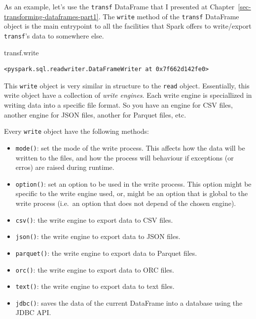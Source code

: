 \documentclass[
  11pt,
  letterpaper,
  DIV=11,
  numbers=noendperiod]{scrreprt}
\newenvironment{Shaded}{\begin{snugshade}}{\end{snugshade}}
\newcommand{\NormalTok}[1]{\textcolor[rgb]{0.00,0.23,0.31}{#1}}
\providecommand{\tightlist}{%
  \setlength{\itemsep}{0pt}\setlength{\parskip}{0pt}}\usepackage{longtable,booktabs,array}
\begin{document}
As an example, let's use the \texttt{transf} DataFrame that I presented
at Chapter~\ref{sec-transforming-dataframes-part1}. The \texttt{write}
method of the \texttt{transf} DataFrame object is the main entrypoint to
all the facilities that Spark offers to write/export \texttt{transf}'s
data to somewhere else.

\begin{Shaded}
\begin{Highlighting}[]
\NormalTok{transf.write}
\end{Highlighting}
\end{Shaded}

\begin{verbatim}
<pyspark.sql.readwriter.DataFrameWriter at 0x7f662d142fe0>
\end{verbatim}

This \texttt{write} object is very similar in structure to the
\texttt{read} object. Essentially, this write object have a collection
of \emph{write engines}. Each write engine is speciallized in writing
data into a specific file format. So you have an engine for CSV files,
another engine for JSON files, another for Parquet files, etc.

Every \texttt{write} object have the following methods:

\begin{itemize}
\tightlist
\item
  \texttt{mode()}: set the mode of the write process. This affects how
  the data will be written to the files, and how the process will
  behaviour if exceptions (or erros) are raised during runtime.
\item
  \texttt{option()}: set an option to be used in the write process. This
  option might be specific to the write engine used, or, might be an
  option that is global to the write process (i.e.~an option that does
  not depend of the chosen engine).
\item
  \texttt{csv()}: the write engine to export data to CSV files.
\item
  \texttt{json()}: the write engine to export data to JSON files.
\item
  \texttt{parquet()}: the write engine to export data to Parquet files.
\item
  \texttt{orc()}: the write engine to export data to ORC files.
\item
  \texttt{text()}: the write engine to export data to text files.
\item
  \texttt{jdbc()}: saves the data of the current DataFrame into a
  database using the JDBC API.
\end{itemize}
\end{document}
